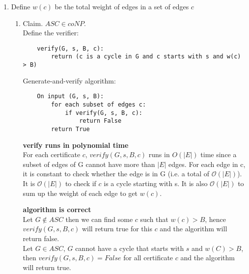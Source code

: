 \documentclass[11pt]{article}
\begin{document}
\begin{enumerate}
\begin{proof}
Then, I'll show that there is no incompatible tools in $S$. \\
Suppose exists tools $p,q\in S$ that are incompatible, then $X_p+X_q = 2$ since they are both in $S$, while it contradicts with the constraint $X_p + X_q \in\{0,1\}$ for each pair of incompatible tools. Therefore, $S$ does not contain incompatible tools. 

\end{proof}
\newpage
\item Define $w(c)$ be the total weight of edges in a set of edges $c$
\begin{enumerate}
    \item Claim. $ASC\in coNP$. \\
    Define the verifier:
    \begin{lstlisting}
    verify(G, s, B, c):
        return (c is a cycle in G and c starts with s and w(c) > B)
    \end{lstlisting}
    Generate-and-verify algorithm:
    \begin{lstlisting}
    On input (G, s, B):
        for each subset of edges c:
            if verify(G, s, B, c):
                return False
        return True
    \end{lstlisting}
    \textbf{verify runs in polynomial time} \\
    For each certificate $c$, $verify(G, s, B, c)$ runs in $O(|E|)$ time since a subset of edges of G cannot have more than $|E|$ edges. For each edge in c, it is constant to check whether the edge is in G (i.e. a total of $\mathcal{O}(|E|)$). It is $\mathcal{O}(|E|)$ to check if $c$ is a cycle starting with s. It is also $\mathcal{O}(|E|)$ to sum up the weight of each edge to get $w(c)$.  
    
    \textbf{algorithm is correct}\\
    Let $G\not\in ASC$ then we can find some $c$ such that $w(c)>B$, hence $verify(G, s, B, c)$ will return true for this $c$ and the algorithm will return false. \\ 
    Let $G \in ASC$, $G$ cannot have a cycle that starts with $s$ and $w(C)> B$, then $verify(G, s, B, c)=False$ for all certificate $c$ and the algorithm will return true.\\
    

\end{enumerate}
\end{enumerate}
\end{document}
